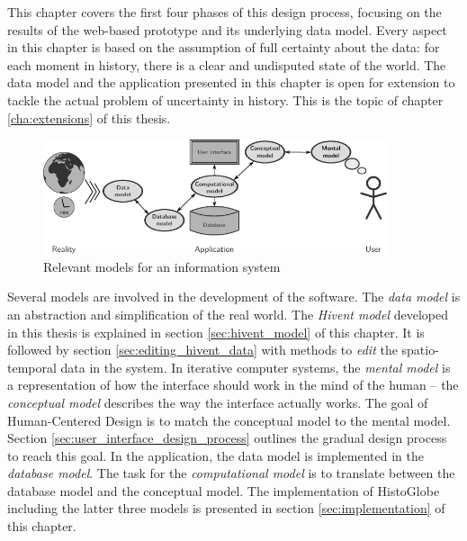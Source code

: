 This chapter covers the first four phases of this design process, focusing on the results of the web-based prototype and its underlying data model. Every aspect in this chapter is based on the assumption of full certainty about the data: for each moment in history, there is a clear and undisputed state of the world. The data model and the application presented in this chapter is open for extension to tackle the actual problem of uncertainty in history. This is the topic of chapter \ref{cha:extensions} of this thesis.

\begin{figure}[H]
  \vspace{1.5em}
  \centering
  \includegraphics[width=0.9\textwidth]{graphics/development/models}
  \caption{Relevant models for an information system}
  \label{fig:models}
\end{figure}

Several models are involved in the development of the software. The \emph{data model} is an abstraction and simplification of the real world. The \emph{Hivent model} developed in this thesis is explained in section \ref{sec:hivent_model} of this chapter. It is followed by section \ref{sec:editing_hivent_data} with methods to \emph{edit} the spatio-temporal data in the system. In iterative computer systems, the \emph{mental model} is a representation of how  the interface should work in the mind of the human -- the \emph{conceptual model} describes the way the interface actually works. The goal of Human-Centered Design is to match the conceptual model to the mental model. Section \ref{sec:user_interface_design_process} outlines the gradual design process to reach this goal. In the application, the data model is implemented in the \emph{database model}. The task for the \emph{computational model} is to translate between the database model and the conceptual model. The implementation of HistoGlobe including the latter three models is presented in section \ref{sec:implementation} of this chapter.

\newpage





